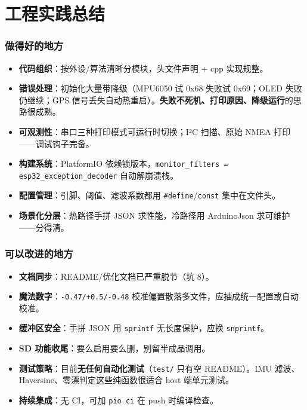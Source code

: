 \documentclass[UTF8,11pt,a4paper]{ctexart}
\begin{document}
\section{工程实践总结}
\subsubsection{做得好的地方}
\begin{itemize}
  \item \textbf{代码组织}：按外设/算法清晰分模块，头文件声明 + cpp 实现规整。
  \item \textbf{错误处理}：初始化大量带降级（MPU6050 试 0x68 失败试 0x69；OLED 失败仍继续；GPS 信号丢失自动热重启）。\textbf{失败不死机、打印原因、降级运行}的思路很成熟。
  \item \textbf{可观测性}：串口三种打印模式可运行时切换；I²C 扫描、原始 NMEA 打印——调试钩子完备。
  \item \textbf{构建系统}：PlatformIO 依赖锁版本，\texttt{monitor\_filters = esp32\_exception\_decoder} 自动解崩溃栈。
  \item \textbf{配置管理}：引脚、阈值、滤波系数都用 \texttt{\#define}/\texttt{const} 集中在文件头。
  \item \textbf{场景化分层}：热路径手拼 JSON 求性能，冷路径用 ArduinoJson 求可维护——分得清。
\end{itemize}
\subsubsection{可以改进的地方}
\begin{itemize}
  \item \textbf{文档同步}：README/优化文档已严重脱节（坑 8）。
  \item \textbf{魔法数字}：\texttt{-0.47/+0.5/-0.48} 校准偏置散落多文件，应抽成统一配置或自动校准。
  \item \textbf{缓冲区安全}：手拼 JSON 用 \texttt{sprintf} 无长度保护，应换 \texttt{snprintf}。
  \item \textbf{SD 功能收尾}：要么启用要么删，别留半成品调用。
  \item \textbf{测试策略}：目前\textbf{无任何自动化测试}（\texttt{test/} 只有空 README）。IMU 滤波、Haversine、零漂判定这些纯函数很适合 host 端单元测试。
  \item \textbf{持续集成}：无 CI，可加 \texttt{pio ci} 在 push 时编译检查。
\end{itemize}
\end{document}
